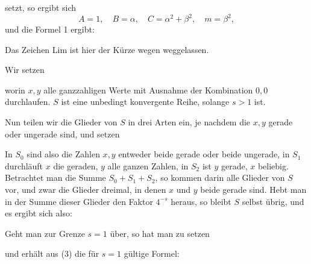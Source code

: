 setzt, so ergibt sich
\[
A = 1, \quad B = \alpha, \quad C = \alpha^2+\beta^2, \quad m = \beta^2,
\]
und die Formel 1 ergibt:


Das Zeichen Lim ist hier der Kürze wegen weggelassen.

Wir setzen


worin $x, y$ alle ganzzahligen Werte mit Ausnahme der Kombination $0,0$ durchlaufen. $S$ ist eine unbedingt konvergente Reihe, solange $s > 1$ ist.

Nun teilen wir die Glieder von $S$ in drei Arten ein, je nachdem die $x, y$ gerade oder ungerade sind, und setzen


In $S_0$ sind also die Zahlen $x, y$ entweder beide gerade oder beide ungerade, in $S_1$ durchläuft $x$ die geraden, $y$ alle ganzen Zahlen, in $S_2$ ist $y$ gerade, $x$ beliebig. Betrachtet man die Summe $S_0+S_1+S_2$, so kommen darin alle Glieder von $S$ vor, und zwar die Glieder dreimal, in denen $x$ und $y$ beide gerade sind. Hebt man in der Summe dieser Glieder den Faktor $4^{-s}$ heraus, so bleibt $S$ selbst übrig, und es ergibt sich also:


Geht man zur Grenze $s = 1$ über, so hat man zu setzen


und erhält aus (3) die für $s = 1$ gültige Formel:

